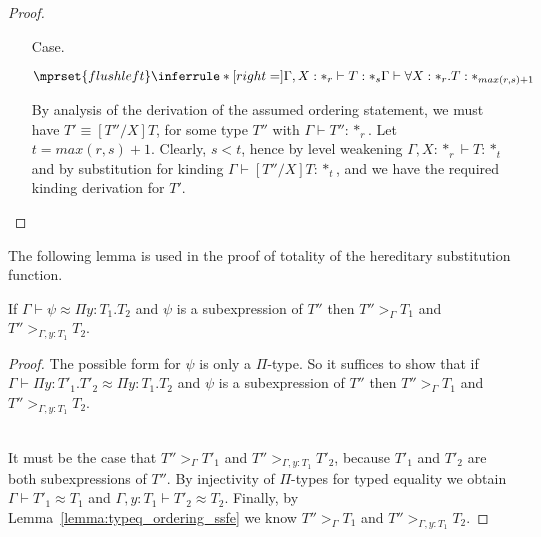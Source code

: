 \begin{proof}
\begin{itemize}
\item[Case.]\ \\
  \begin{center}
    \begin{math}
      $$\mprset{flushleft}
      \inferrule* [right=] {
        \Gamma,X : *_r \vdash T : *_s
      }{\Gamma \vdash \forall X:*_r.T : *_{max(r,s)+1}}
    \end{math}
  \end{center}
  By analysis of the derivation of the assumed ordering statement, we must have 
  $T' \equiv [T''/X]T$, for some type $T''$ with 
  $\Gamma \vdash T'':*_r$.  Let $t = max(r,s) + 1$. Clearly, 
  $s < t$, hence by level weakening $\Gamma,X:*_r \vdash T:*_t$ and by substitution 
  for kinding $\Gamma \vdash [T''/X]T:*_t$, and we have the required kinding 
  derivation for $T'$.  
\end{itemize}
\end{proof}
The following lemma is used in the proof of totality of the hereditary substitution function.
\begin{lemma}
  \label{lemma:A_prop_ssfe}
  If $\Gamma \vdash \psi \approx \Pi y:T_1.T_2$ and $\psi$ is a subexpression of $T''$ then
  $T'' >_\Gamma T_1$ and $T'' >_{\Gamma,y:T_1} T_2$.
\end{lemma}
\begin{proof}
  The possible form for $\psi$ is only a $\Pi$-type.  So it suffices to show that
  if $\Gamma \vdash \Pi y:T'_1.T'_2 \approx \Pi y:T_1.T_2$ and $\psi$ is
  a subexpression of $T''$ then $T'' >_\Gamma T_1$ and $T'' >_{\Gamma,y:T_1} T_2$.

  \ \\
  It must be the case that $T'' >_\Gamma T'_1$ and $T'' >_{\Gamma,y:T_1} T'_2$, because
  $T'_1$ and $T'_2$ are both subexpressions of $T''$.  By injectivity of $\Pi$-types
  for typed equality we obtain $\Gamma \vdash T'_1 \approx T_1$ and $\Gamma,y:T_1 \vdash T'_2 \approx T_2$.
  Finally, by Lemma~\ref{lemma:typeq_ordering_ssfe} we know $T'' >_\Gamma T_1$ and $T'' >_{\Gamma,y:T_1} T_2$.
\end{proof}

